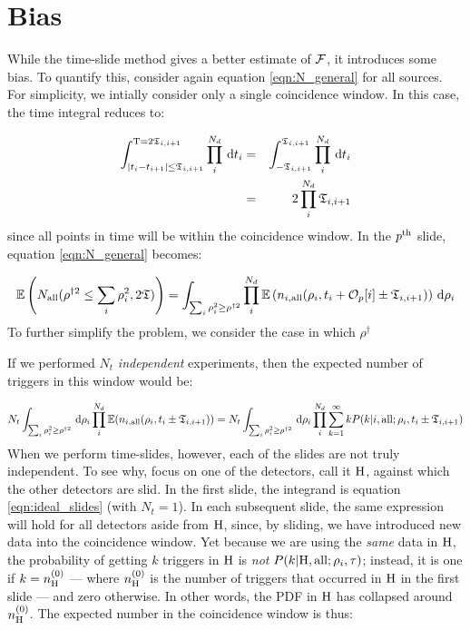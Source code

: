 \section{Bias}
\label{sec:bias}

While the time-slide method gives a better estimate of $\mathcal{F}$, it introduces some bias. To quantify this, consider again equation \ref{eqn:N_general} for all sources. For simplicity, we intially consider only a single coincidence window. In this case, the time integral reduces to:

\begin{eqnarray}
\int_{|t_i - t_{i+1}| \le \mathfrak{T}_{i,i+1}}^{\mathrm{T}=2\mathfrak{T}_{i,i+1}}\prod_i^{N_d} \,\mathrm{d} t_i & = & \int_{-\mathfrak{T}_{i,i+1}}^{\mathfrak{T}_{i,i+1}} \prod_i^{N_d} \,\mathrm{d} t_i \nonumber \\
& = & 2 \prod_i^{N_d} \mathfrak{T}_{i,i+1} \nonumber
\end{eqnarray}
since all points in time will be within the coincidence window. In the $p^{\mathrm{th}}$ slide, equation \ref{eqn:N_general} becomes:

\begin{equation}
\mathbb{E}\left(N_{\mathrm{all}}(\rho^{\dagger2} \leq \sum_i\rho_i^2, 2\mathfrak{T} )\right) = \int_{\sum_i\rho_i^2 \geq \rho^{\dagger2}} \prod_i^{N_d} \mathbb{E}\left(n_{i,\mathrm{all}}(\rho_i,t_i + \mathcal{O}_p[i] \pm \mathfrak{T}_{i,i+1} ) \right) \,\mathrm{d}\rho_i
\end{equation}
To further simplify the problem, we consider the case in which $\rho^\dagger$


If we performed $N_t$ \emph{independent} experiments, then the expected number of triggers in this window would be:

\begin{equation}
\label{eqn:ideal_slides}
N_t \int_{\sum_i\rho_i^2 \geq \rho^{\dagger2}} \,\mathrm{d} \rho_i \prod_{i}^{N_d} \mathbb{E}( n_{i,\mathrm{all}}(\rho_i, t_i \pm \mathfrak{T}_{i,i+1}) ) = N_t \int_{\sum_i\rho_i^2 \geq \rho^{\dagger2}} \,\mathrm{d} \rho_i \prod_{i}^{N_d} \sum_{k=1}^{\infty} k P(k|i,\mathrm{all}; \rho_i, t_i \pm \mathfrak{T}_{i,i+1})
\end{equation}
When we perform time-slides, however, each of the slides are not truly independent. To see why, focus on one of the detectors, call it $\mathrm{H}$, against which the other detectors are slid. In the first slide, the integrand is equation \ref{eqn:ideal_slides} (with $N_t = 1$). In each subsequent slide, the same expression will hold for all detectors aside from $\mathrm{H}$, since, by sliding, we have introduced new data into the coincidence window. Yet because we are using the \emph{same} data in $\mathrm{H}$, the probability of getting $k$ triggers in $\mathrm{H}$ is \emph{not} $P(k|\mathrm{H},\mathrm{all}; \rho_i, \tau)$; instead, it is one if $k = n^{(0)}_{\mathrm{H}}$ --- where $n^{(0)}_{\mathrm{H}}$ is the number of triggers that occurred in $\mathrm{H}$ in the first slide --- and zero otherwise. In other words, the \ac{PDF} in $\mathrm{H}$ has collapsed around $n^{(0)}_{\mathrm{H}}$. The expected number in the coincidence window is thus:

